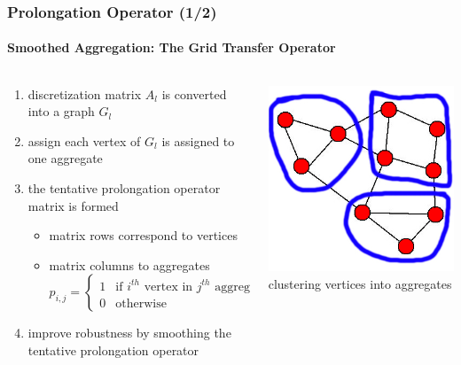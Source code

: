 \documentclass[xcolor=pdftex,table,10pt]{beamer}
\begin{document}
	\begin{frame}
		\frametitle{Prolongation Operator (1/2)}
		\framesubtitle{Smoothed Aggregation: The Grid Transfer Operator}

		\begin{columns}
		\begin{column}{6.7cm}
			\begin{enumerate}
				\item discretization matrix $A_l$ is converted into a graph $G_l$
				\item assign each vertex of $G_l$ is assigned to one aggregate %
				\item the tentative prolongation operator matrix is formed 
				\begin{itemize}
					\item matrix rows correspond to vertices
					\item matrix columns to aggregates
					\[
						p_{i,j} = \begin{cases} 1 & \text{if } i^{th} \text{ vertex in } j^{th} \text{ aggregate} \\ 
								        0 & \text{otherwise}
							  \end{cases}
					\]
				\end{itemize}
				\item improve robustness by smoothing the tentative prolongation operator

			\end{enumerate}
		\end{column}

		\begin{column}{4cm}
			\begin{center}
				\includegraphics[width=1.0\textwidth]{aggregation.jpg} \\
				\scriptsize{clustering vertices into aggregates}
			\end{center}
		\end{column}
		\end{columns}


\end{frame}
\end{document}
